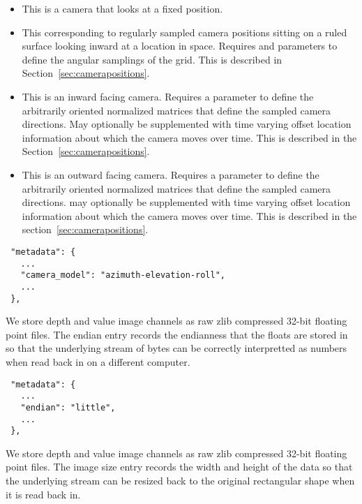 \begin{itemize}
\item \camstatic This is a camera that looks at a fixed position. 
\item \camphi This corresponding to regularly sampled camera positions sitting on a ruled surface looking inward at a location in space. Requires \cphi and \ctheta parameters to define the angular samplings of the grid. This is described in Section~\ref{sec:camerapositions}.
\item \camazimuth This is an inward facing camera. Requires a \pose parameter to define the arbitrarily oriented normalized matrices that define the sampled camera directions. May optionally be supplemented with time varying offset location information about which the camera moves over time. This is described in the Section~\ref{sec:camerapositions}.
\item \camyaw This is an outward facing camera. 
Requires a \pose parameter to define the arbitrarily oriented normalized matrices that define the sampled camera directions. may optionally be supplemented with time varying offset location information about which the camera moves over time. This is described in the section~\ref{sec:camerapositions}.
\end{itemize}

\begin{verbatim}
 "metadata": {
   ...
   "camera_model": "azimuth-elevation-roll",
   ...
 },
\end{verbatim}

\label{sec:endian}

We store depth and value image channels as raw zlib compressed 32-bit
floating point files. The endian entry records the endianness that the
floats are stored in so that the underlying stream of bytes can be
correctly interpretted as numbers when read back in on a different computer.

\begin{verbatim}
 "metadata": {
   ...
   "endian": "little",
   ...
 },
\end{verbatim}


We store depth and value image channels as raw zlib compressed 32-bit
floating point files. The image size entry records the width and height
of the data so that the underlying stream can be resized back
to the original rectangular shape when it is read back in.

